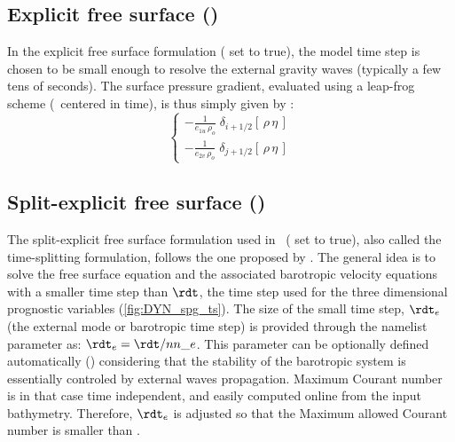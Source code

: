 \documentclass[../main/NEMO_manual]{subfiles}
\begin{document}
\subsection[Explicit free surface (\forcode{ln_dynspg_exp})]{Explicit free surface (\protect{})}
\label{subsec:DYN_spg_exp}

In the explicit free surface formulation ( set to true),
the model time step is chosen to be small enough to resolve the external gravity waves
(typically a few tens of seconds).
The surface pressure gradient, evaluated using a leap-frog scheme (\ie\ centered in time),
is thus simply given by :
\begin{equation}
  \label{eq:DYN_spg_exp}
  \left\{
    \begin{aligned}
      - \frac{1}{e_{1u}\,\rho_o} \;	\delta_{i+1/2} \left[  \,\rho \,\eta\,  \right] 	\\
      - \frac{1}{e_{2v}\,\rho_o} \;	\delta_{j+1/2} \left[  \,\rho \,\eta\,  \right]
    \end{aligned}
  \right.
\end{equation}

\subsection[Split-explicit free surface (\forcode{ln_dynspg_ts})]{Split-explicit free surface (\protect{})}
\label{subsec:DYN_spg_ts}

The split-explicit free surface formulation used in \NEMO\ ( set to true),
also called the time-splitting formulation, follows the one proposed by \citet{shchepetkin.mcwilliams_OM05}.
The general idea is to solve the free surface equation and the associated barotropic velocity equations with
a smaller time step than $\rdt$, the time step used for the three dimensional prognostic variables
(\autoref{fig:DYN_spg_ts}).
The size of the small time step, $\rdt_e$ (the external mode or barotropic time step) is provided through
the  namelist parameter as: $\rdt_e = \rdt / nn\_e$.
This parameter can be optionally defined automatically () considering that
the stability of the barotropic system is essentially controled by external waves propagation.
Maximum Courant number is in that case time independent, and easily computed online from the input bathymetry.
Therefore, $\rdt_e$ is adjusted so that the Maximum allowed Courant number is smaller than .
\end{document}
